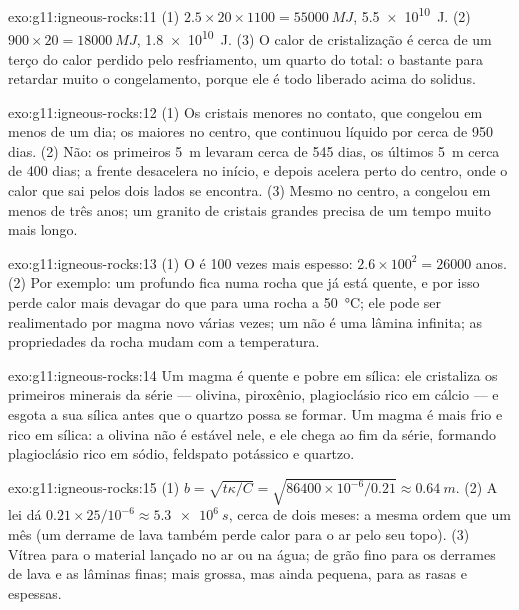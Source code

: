 \begin{solution}{exo:g11:igneous-rocks:11}
(1) $2.5 \times 20 \times 1100 = \qty{55000}{MJ}$, \qty{5.5e10}{J}.
(2) $900 \times 20 = \qty{18000}{MJ}$, \qty{1.8e10}{J}. (3) O calor de
cristalização é cerca de um terço do calor perdido pelo resfriamento, um
quarto do total: o bastante para retardar muito o congelamento, porque ele é
todo liberado acima do solidus.
\end{solution}

\begin{solution}{exo:g11:igneous-rocks:12}
(1) Os cristais menores no contato, que congelou em menos de um dia; os
maiores no centro, que continuou líquido por cerca de 950 dias. (2) Não: os
primeiros \qty{5}{m} levaram cerca de 545 dias, os últimos \qty{5}{m} cerca
de 400 dias; a frente desacelera no início, e depois acelera perto do
centro, onde o calor que sai pelos dois lados se encontra. (3) Mesmo no
centro, a  congelou em menos de três anos; um granito de cristais
grandes precisa de um tempo muito mais longo.
\end{solution}

\begin{solution}{exo:g11:igneous-rocks:13}
(1) O  é 100 vezes mais espesso: $2.6 \times 100^2 = \num{26000}$
anos. (2) Por exemplo: um  profundo fica numa rocha que já está
quente, e por isso perde calor mais devagar do que para uma rocha a
\qty{50}{\degreeCelsius}; ele pode ser realimentado por magma novo várias
vezes; um  não é uma lâmina infinita; as propriedades da rocha mudam
com a temperatura.
\end{solution}

\begin{solution}{exo:g11:igneous-rocks:14}
Um magma  é quente e pobre em sílica: ele cristaliza os primeiros
minerais da série --- olivina, piroxênio, plagioclásio rico em cálcio --- e
esgota a sua sílica antes que o quartzo possa se formar. Um magma  é
mais frio e rico em sílica: a olivina não é estável nele, e ele chega ao fim
da série, formando plagioclásio rico em sódio, feldspato potássico e
quartzo.
\end{solution}

\begin{solution}{exo:g11:igneous-rocks:15}
(1) $b = \sqrt{t\kappa/C} = \sqrt{86400 \times 10^{-6}/0.21} \approx
\qty{0.64}{m}$. (2) A lei dá $0.21 \times 25/10^{-6} \approx
\qty{5.3e6}{s}$, cerca de dois meses: a mesma ordem que um mês (um derrame
de lava também perde calor para o ar pelo seu topo). (3) Vítrea para o
material lançado no ar ou na água; de grão fino para os derrames de lava e
as lâminas finas; mais grossa, mas ainda pequena, para as  rasas e
espessas.
\end{solution}

